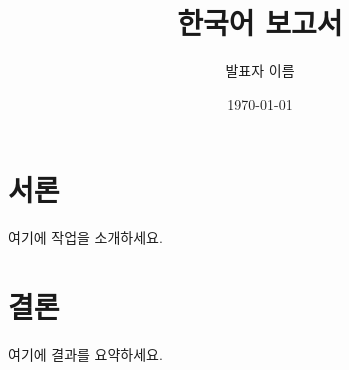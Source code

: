 \documentclass[12pt]{report}
\title{한국어 보고서}
\author{발표자 이름}
\date{\today}
\begin{document}
\maketitle
\tableofcontents

\chapter{서론}
여기에 작업을 소개하세요.

\chapter{결론}
여기에 결과를 요약하세요.

% 
\end{document}
